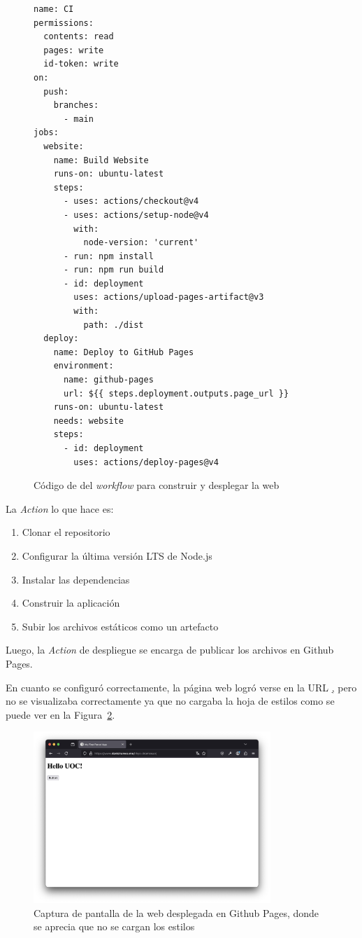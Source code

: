\documentclass{article}
\begin{document}
\begin{figure}[h!]
\begin{verbatim}
name: CI
permissions:
  contents: read
  pages: write
  id-token: write
on:
  push:
    branches:
      - main
jobs:
  website:
    name: Build Website
    runs-on: ubuntu-latest
    steps:
      - uses: actions/checkout@v4
      - uses: actions/setup-node@v4
        with:
          node-version: 'current'
      - run: npm install
      - run: npm run build
      - id: deployment
        uses: actions/upload-pages-artifact@v3
        with:
          path: ./dist
  deploy:
    name: Deploy to GitHub Pages
    environment:
      name: github-pages
      url: ${{ steps.deployment.outputs.page_url }}
    runs-on: ubuntu-latest
    needs: website
    steps:
      - id: deployment
        uses: actions/deploy-pages@v4
\end{verbatim}
\caption{Código de del \textit{workflow} para construir y desplegar la web}
\label{fig:workflow}
\end{figure}

La \textit{Action} lo que hace es:

\begin{enumerate}
    \item Clonar el repositorio
    \item Configurar la última versión LTS de Node.js
    \item Instalar las dependencias
    \item Construir la aplicación
    \item Subir los archivos estáticos como un artefacto
\end{enumerate}

Luego, la \textit{Action} de despliegue se encarga de publicar los archivos en Github Pages.

En cuanto se configuró correctamente, la página web logró verse en la URL \href{https://www.danielramos.me/hhyc-dramosac}, pero no se visualizaba correctamente ya que no cargaba la hoja de estilos como se puede ver en la Figura~\ref{fig:web-semi-deployed}.

\begin{figure}[h!]
    \centering
    \includegraphics[width=0.8\textwidth]{./img/web-semi-deployed}
    \caption{Captura de pantalla de la web desplegada en Github Pages, donde se aprecia que no se cargan los estilos}
    \label{fig:web-semi-deployed}
\end{figure}
\end{document}
